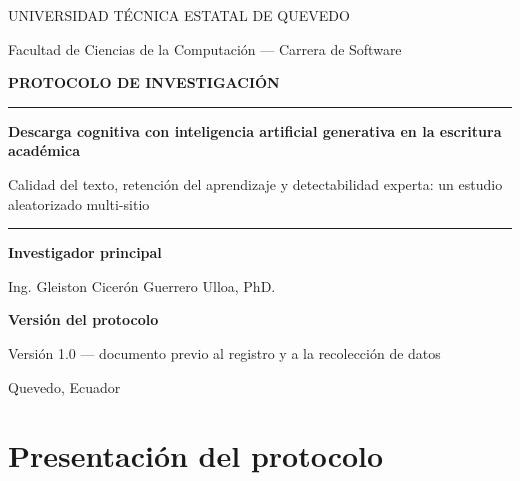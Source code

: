 \documentclass[12pt,a4paper,openany]{report}
\begin{document}
    
    \begin{titlepage}
        \centering
        \vspace*{1.5cm}
        {\sffamily\large\color{grismedio} UNIVERSIDAD T\'ECNICA ESTATAL DE QUEVEDO\par}
        {\sffamily\normalsize\color{grismedio} Facultad de Ciencias de la Computaci\'on --- Carrera de Software\par}
        \vspace{2.2cm}
        {\sffamily\Large\bfseries\color{azulinstitucional} PROTOCOLO DE INVESTIGACI\'ON\par}
        \vspace{1.0cm}
        \rule{\textwidth}{1.2pt}
        \vspace{0.8cm}
        {\sffamily\LARGE\bfseries Descarga cognitiva con inteligencia artificial generativa en la escritura acad\'emica\par}
        \vspace{0.5cm}
        {\sffamily\large Calidad del texto, retenci\'on del aprendizaje y detectabilidad experta: un estudio aleatorizado multi-sitio\par}
        \vspace{0.8cm}
        \rule{\textwidth}{1.2pt}
        \vfill
        {\sffamily\normalsize\textbf{Investigador principal}\par}
        {\normalsize Ing. Gleiston Cicer\'on Guerrero Ulloa, PhD.\par}
        \vspace{0.6cm}
        {\sffamily\normalsize\textbf{Versi\'on del protocolo}\par}
        {\normalsize Versi\'on 1.0 --- documento previo al registro y a la recolecci\'on de datos\par}
        \vspace{0.6cm}
        {\normalsize\color{grismedio} Quevedo, Ecuador\par}
        \vspace{1.0cm}
    \end{titlepage}
    
    \tableofcontents
    \clearpage
    
    \chapter{Presentaci\'on del protocolo}
    
\end{document}
